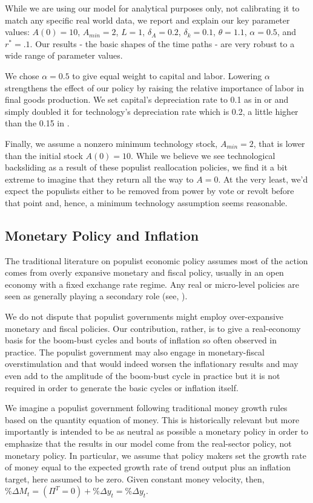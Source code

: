 \documentclass{OUP-EJ}
\begin{document}
While we are using our model for analytical purposes only, not calibrating it to match any specific real world data, we report and explain our key parameter values: $A(0) = 10$, $A_{min}=2$, $L=1$, $\delta_A = 0.2$, $\delta_k = 0.1$, $\theta = 1.1$, $\alpha = 0.5$, and $r^* = .1$. Our results - the basic shapes of the time paths - are very robust to a wide range of parameter values.  

We chose $\alpha = 0.5$ to give equal weight to capital and labor. Lowering $\alpha$ strengthens the effect of our policy by raising the relative importance of labor in final goods production.  We set capital's depreciation rate to 0.1 as in \cite{Mendoza1991} or \cite{UribeSchmitt2017} and simply doubled it for technology's depreciation rate which is 0.2, a little higher than the 0.15 in \cite{DouEtAl2024}.

Finally, we assume a nonzero minimum technology stock, $A_{min}=2$, that is lower than the initial stock $A(0)=10$. While we believe we see technological backsliding as a result of these populist reallocation policies, we find it a bit extreme to imagine that they return all the way to $A=0$.  At the very least, we'd expect the populists either to be removed from power by vote or revolt before that point and, hence, a minimum technology assumption seems reasonable.

\subsection{Monetary Policy and Inflation}

The traditional literature on populist economic policy assumes most of the action comes from overly expansive monetary and fiscal policy, usually in an open economy with a fixed exchange rate regime.  Any real or micro-level policies are seen as generally playing a secondary role (see, \cite{DornbuschEdwards1991}).

We do not dispute that populist governments might employ over-expansive monetary and fiscal policies.  Our contribution, rather, is to give a real-economy basis for the boom-bust cycles and bouts of inflation so often observed in practice. The populist government may also engage in monetary-fiscal overstimulation and that would indeed worsen the inflationary results and may even add to the amplitude of the boom-bust cycle in practice but it is not required in order to generate the basic cycles or inflation itself.

We imagine a populist government following traditional money growth rules based on the quantity equation of money.  This is historically relevant but more importantly is intended to be as neutral as possible a monetary policy in order to emphasize that the results in our model come from the real-sector policy, not monetary policy.  In particular, we assume that policy makers set the growth rate of money equal to the expected growth rate of trend output plus an inflation target, here assumed to be zero. Given constant money velocity, then, $\% \Delta M_t = (\Pi^T =0) + \% \Delta y_t = \%\Delta y_t$.
\end{document}
